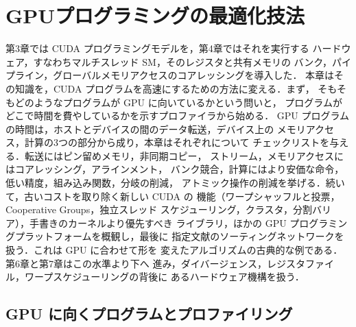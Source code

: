 \documentclass[../main.tex]{subfiles}
\begin{document}
\chapter{GPUプログラミングの最適化技法}

第3章では CUDA プログラミングモデルを，第4章ではそれを実行する
ハードウェア，すなわちマルチスレッド SM，そのレジスタと共有メモリの
バンク，パイプライン，グローバルメモリアクセスのコアレッシングを導入した．
本章はその知識を，CUDA プログラムを高速にするための方法に変える．まず，
そもそもどのようなプログラムが GPU に向いているかという問いと，
プログラムがどこで時間を費やしているかを示すプロファイラから始める．
GPU プログラムの時間は，ホストとデバイスの間のデータ転送，デバイス上の
メモリアクセス，計算の3つの部分から成り，本章はそれぞれについて
チェックリストを与える．転送にはピン留めメモリ，非同期コピー，
ストリーム，メモリアクセスにはコアレッシング，アラインメント，
バンク競合，計算にはより安価な命令，低い精度，組み込み関数，分岐の削減，
アトミック操作の削減を挙げる．続いて，古いコストを取り除く新しい CUDA の
機能（ワープシャッフルと投票，Cooperative Groups，独立スレッド
スケジューリング，クラスタ，分割バリア），手書きのカーネルより優先すべき
ライブラリ，ほかの GPU プログラミングプラットフォームを概観し，最後に
指定文献のソーティングネットワークを扱う．これは GPU に合わせて形を
変えたアルゴリズムの古典的な例である．第6章と第7章はこの水準より下へ
進み，ダイバージェンス，レジスタファイル，ワープスケジューリングの背後に
あるハードウェア機構を扱う．

\section{GPU に向くプログラムとプロファイリング}
\label{sec:l05-profiling}
\end{document}
